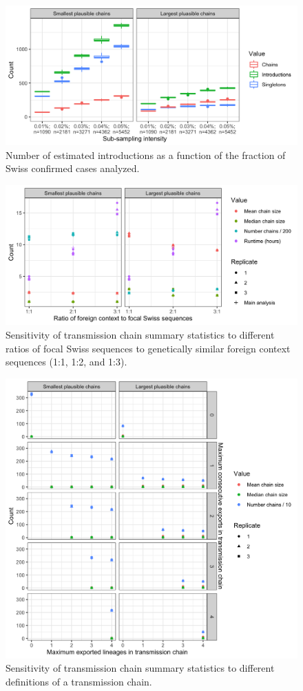 \documentclass[9pt,twoside,lineno]{pnas-new}
\begin{document}
\begin{figure}
\centering
\includegraphics[width = 11.4cm]{figures/fig_SX_sensitivity_subsampling.png}
\caption{Number of estimated introductions as a function of the fraction of Swiss confirmed cases analyzed.}  
\label{fig:sensitivity_downsampling}
\end{figure}

\begin{figure}
\centering
\includegraphics[width = 11.4cm]{figures/fig_SX_sensitivity_context_set_size.png}
\caption{Sensitivity of transmission chain summary statistics to different ratios of focal Swiss sequences to genetically similar foreign context sequences (1:1, 1:2, and 1:3).}  
\label{fig:sensitivity_context_set_size}
\end{figure}

\begin{figure}
\centering
\includegraphics[width = 11.4cm]{figures/fig_SX_sensitivity_chain_defn.png}
\caption{Sensitivity of transmission chain summary statistics to different definitions of a transmission chain.}  
\label{fig:sensitivity_m_p}
\end{figure}
\end{document}
